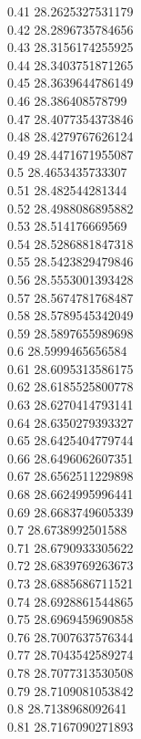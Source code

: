 {0.41	28.2625327531179\\
0.42	28.2896735784656\\
0.43	28.3156174255925\\
0.44	28.3403751871265\\
0.45	28.3639644786149\\
0.46	28.386408578799\\
0.47	28.4077354373846\\
0.48	28.4279767626124\\
0.49	28.4471671955087\\
0.5	28.4653435733307\\
0.51	28.482544281344\\
0.52	28.4988086895882\\
0.53	28.514176669569\\
0.54	28.5286881847318\\
0.55	28.5423829479846\\
0.56	28.5553001393428\\
0.57	28.5674781768487\\
0.58	28.5789545342049\\
0.59	28.5897655989698\\
0.6	28.5999465656584\\
0.61	28.6095313586175\\
0.62	28.6185525800778\\
0.63	28.6270414793141\\
0.64	28.6350279393327\\
0.65	28.6425404779744\\
0.66	28.6496062607351\\
0.67	28.6562511229898\\
0.68	28.6624995996441\\
0.69	28.6683749605339\\
0.7	28.6738992501588\\
0.71	28.6790933305622\\
0.72	28.6839769263673\\
0.73	28.6885686711521\\
0.74	28.6928861544865\\
0.75	28.6969459690858\\
0.76	28.7007637576344\\
0.77	28.7043542589274\\
0.78	28.7077313530508\\
0.79	28.7109081053842\\
0.8	28.7138968092641\\
0.81	28.7167090271893\\
}
